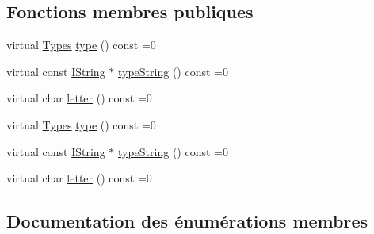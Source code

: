 \subsection*{Fonctions membres publiques}
\begin{DoxyCompactItemize}
\item 
virtual \hyperlink{class_i_doc_symbol_aaf2e0ad5f92964ff52017b23714c59f0}{Types} \hyperlink{class_i_doc_symbol_a36b92173b3329d0405a9e0794ae04ef4}{type} () const  =0
\item 
virtual const \hyperlink{class_i_string}{I\+String} $\ast$ \hyperlink{class_i_doc_symbol_afcfe1258d8148a54e3837a988d292e27}{type\+String} () const  =0
\item 
virtual char \hyperlink{class_i_doc_symbol_ace6d10b613cccdf2885e0e538f2b3a9d}{letter} () const  =0
\item 
virtual \hyperlink{class_i_doc_symbol_aaf2e0ad5f92964ff52017b23714c59f0}{Types} \hyperlink{class_i_doc_symbol_a36b92173b3329d0405a9e0794ae04ef4}{type} () const  =0
\item 
virtual const \hyperlink{class_i_string}{I\+String} $\ast$ \hyperlink{class_i_doc_symbol_afcfe1258d8148a54e3837a988d292e27}{type\+String} () const  =0
\item 
virtual char \hyperlink{class_i_doc_symbol_ace6d10b613cccdf2885e0e538f2b3a9d}{letter} () const  =0
\end{DoxyCompactItemize}


\subsection{Documentation des énumérations membres}
\hypertarget{class_i_doc_symbol_aaf2e0ad5f92964ff52017b23714c59f0}{}
